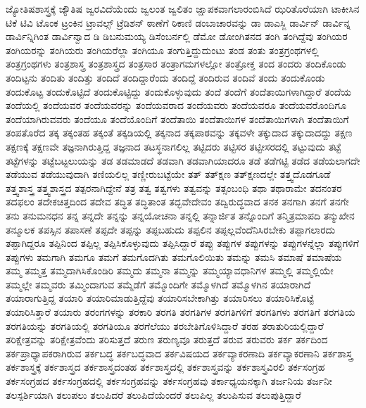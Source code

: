 {ಜ್ಯೋತಿಷಶಾಸ್ತ್ರಕ್ಕೆ
ಜ್ಯೌತಿಷ
ಜ್ವರವಿದೆಯೆಂದು
ಜ್ವಲಂತ
ಜ್ವಲಿತಂ
ಜ್ಷಾಪಕವಾಗಲಾರಂಬಿಸಿದೆ
ಝರಿತೊರೆಯಾಗಿ
ಟಾಕೀಸಿನ
ಟಿಕೆ
ಟಿವಿ
ಟೊಂಕ
ಟ್ರಂಕಿನ
ಟ್ರಾವಲ್ಸ್
ಟ್ರೆಡಿಶನ್
ಠಾಣೆಗೆ
ಠಿಕಾಣಿ
ಡಂಬಾಚಾರವನ್ನು
ಡಾ
ಡಾಎಸ್ಜಿ
ಡಾರ್ವಿನ್
ಡಾರ್ವಿನ್ನ
ಡಾರ್ವಿನ್ನಿಗಿಂತ
ಡಾರ್ವಿನ್ವಾದ
ಡಿ
ಡಿಬನುಮಯ್ಯ
ಡಿಸೆಂಬರ್ನಲ್ಲಿ
ಡೆಮೋ
ಡೋಂಗಿತನದ
ತಂಗಿ
ತಂಗಿದ್ದೆವು
ತಂಗಿಯರ
ತಂಗಿಯರನ್ನು
ತಂಗಿಯರು
ತಂಗಿಯರೆಲ್ಲಾ
ತಂಗಿಯೂ
ತಂಗುತ್ತಿದ್ದುದುಂಟು
ತಂಡ
ತಂತು
ತಂತ್ರಗ್ರಂಥಗಳಲ್ಲಿ
ತಂತ್ರಗ್ರಂಥಗಳು
ತಂತ್ರಶಾಸ್ತ್ರ
ತಂತ್ರಶಾಸ್ತ್ರದ
ತಂತ್ರಸಾರ
ತಂತ್ರಾಗಮಗಳಲ್ಲೋ
ತಂತ್ರೋಕ್ತ
ತಂದ
ತಂದರು
ತಂದಿಕೊಂಡು
ತಂದಿಟ್ಟನು
ತಂದಿತು
ತಂದಿತ್ತು
ತಂದಿದೆ
ತಂದಿದ್ದಾರೆಂದು
ತಂದಿದ್ದೆ
ತಂದಿರುವ
ತಂದಿವೆ
ತಂದು
ತಂದುಕೊಂಡು
ತಂದುಕೊಟ್ಟ
ತಂದುಕೊಟ್ಟಿದೆ
ತಂದುಕೊಟ್ಟಿದ್ದು
ತಂದುಕೊಳ್ಳುವುದು
ತಂದೆ
ತಂದೆಗೆ
ತಂದೆತಾಯಿಗಳಾಗಿದ್ದಾರೆ
ತಂದೆಯ
ತಂದೆಯಲ್ಲಿ
ತಂದೆಯವರ
ತಂದೆಯವರನ್ನು
ತಂದೆಯವರಾದ
ತಂದೆಯವರು
ತಂದೆಯವರೂ
ತಂದೆಯವರೊಂದಿಗೂ
ತಂದೆಯಾಗಿರುವವರು
ತಂದೆಯೂ
ತಂದೆಯೊಂದಿಗೆ
ತಂದೆತಾಯಿ
ತಂದೆತಾಯಿಗಳ
ತಂದೆತಾಯಿಗಳಾಗಿ
ತಂದೆತಾಯಿಗೆ
ತಂಪತೊರೆದ
ತಕ್ಕ
ತಕ್ಕಂತಹ
ತಕ್ಕಂತೆ
ತಕ್ಕಡಿಯಲ್ಲಿ
ತಕ್ಕನಾದ
ತಕ್ಕಪಾಠವನ್ನು
ತಕ್ಕವಳೇ
ತಕ್ಕುದಾದ
ತಕ್ಕುದಾದದ್ದು
ತಕ್ಷಣ
ತಕ್ಷಣಕ್ಕೆ
ತಕ್ಷಣವೇ
ತಜ್ಞನಾಗಿರುತ್ತಿದ್ದ
ತಜ್ಞನಾದ
ತಟಸ್ಥನಾಗಲಿಲ್ಲ
ತಟ್ಟಿದರು
ತಟ್ಟಿಸರ
ತಟ್ಟೀಸರದಲ್ಲಿ
ತಟ್ಟುವುದು
ತಟ್ಟೆ
ತಟ್ಟೆಗಳನ್ನು
ತಟ್ಟೆಬಟ್ಟಲುಯನ್ನು
ತಡ
ತಡಮಾಡದೆ
ತಡವಾಗಿ
ತಡವಾಗಿಯಾದರೂ
ತಡೆ
ತಡೆಗಟ್ಟಿ
ತಡೆದ
ತಡೆಯಲಾಗದೇ
ತಡೆಯುವ
ತಡೆಯುವುದಾಗಿ
ತಣಿಯಲಿಲ್ಲ
ತಣ್ಣೀರುಬಟ್ಟೆಯೇ
ತತ್
ತತ್ಕ್ಷಣ
ತತ್ಕ್ಷಣದಲ್ಲೇ
ತತ್ತ್ವದೊಡಗೂಡೆ
ತತ್ತ್ವಶಾಸ್ತ್ರ
ತತ್ತ್ವಶಾಸ್ತ್ರದ
ತತ್ಪರನಾಗಿದ್ದೇನೆ
ತತ್ರ
ತತ್ವ
ತತ್ವಗಳು
ತತ್ವವನ್ನು
ತತ್ಸಂಬಂಧಿ
ತಥಾ
ತಥಾರಾಮೇ
ತದನಂತರ
ತದಫಲಂ
ತದೇಕಚಿತ್ತದಿಂದ
ತದೇವ
ತದ್ಧಿತ
ತದ್ಧಿತಾಂತ
ತದ್ಭವೇದೇವಂ
ತದ್ವಿರುದ್ಧವಾದ
ತನಕ
ತನಗಾಗಿ
ತನಗೆ
ತನಗೇ
ತನು
ತನುಮನಧನ
ತನ್ನ
ತನ್ನದೇ
ತನ್ನನ್ನು
ತನ್ನಯೋಚನಾ
ತನ್ನಲ್ಲಿ
ತನ್ನಾರ್ಜಿತ
ತನ್ನೊಂದಿಗೆ
ತನ್ಮಿತ್ರಮಾಪದಿ
ತನ್ಮುಖೇನ
ತನ್ಮೂಲಕ
ತಪಸ್ಸಿನ
ತಪಾಸಣೆ
ತಪ್ಪದೇ
ತಪ್ಪನ್ನು
ತಪ್ಪಬಹುದು
ತಪ್ಪಲಿನ
ತಪ್ಪಲ್ಲವೆಂದೆನಿಸಿರಬೇಕು
ತಪ್ಪಾಗಲಾರದು
ತಪ್ಪಾಗಿದ್ದರೂ
ತಪ್ಪಿನಿಂದ
ತಪ್ಪಿಲ್ಲ
ತಪ್ಪಿಸಿಕೊಳ್ಳುವುದು
ತಪ್ಪಿಸಿದ್ದಾರೆ
ತಪ್ಪು
ತಪ್ಪುಗಳ
ತಪ್ಪುಗಳನ್ನು
ತಪ್ಪುಗಳನ್ನೆಲ್ಲಾ
ತಪ್ಪುಗಳಿಗೆ
ತಪ್ಪುಗಳು
ತಮಗಾಗಿ
ತಮಗೂ
ತಮಗೆ
ತಮಗೊದಗಿತು
ತಮಗೊಲಿಯಿತು
ತಮನ್ನು
ತಮಸಿ
ತಮಾಷೆ
ತಮಾಷೆಯ
ತಮ್ಮ
ತಮ್ಮತ್ತ
ತಮ್ಮದಾಗಿಸಿಕೊಂಡಿರಿ
ತಮ್ಮದು
ತಮ್ಮನಾ
ತಮ್ಮನ್ನು
ತಮ್ಮಯ್ಯಾವಧಾನಿಗಳ
ತಮ್ಮಲ್ಲಿ
ತಮ್ಮಲ್ಲಿಯೇ
ತಮ್ಮಲ್ಲೇ
ತಮ್ಮವರು
ತಮ್ಮಿಂದಾಗುವ
ತಮ್ಮೆಡೆಗೆ
ತಮ್ಮೊಂದಿಗೇ
ತಮ್ಮೊಳಗಿದೆ
ತಮ್ಮೊಳಗಿನ
ತಯಾರಾಗಿದೆ
ತಯಾರಾಗುತ್ತಿದ್ದ
ತಯಾರಿ
ತಯಾರಿಮಾಡುತ್ತಿದ್ದೆವು
ತಯಾರಿಸಬೇಕಾಗಿತ್ತು
ತಯಾರಿಸಲು
ತಯಾರಿಸಿಕೊಟ್ಟೆ
ತಯಾರಿಸಿತ್ತಾರೆ
ತಯಾರು
ತರಂಗಗಳನ್ನು
ತರಕಾರಿ
ತರಗತಿ
ತರಗತಿಗಳ
ತರಗತಿಗಳಿಗೆ
ತರಗತಿಗಳು
ತರಗತಿಗೆ
ತರಗತಿಯ
ತರಗತಿಯನ್ನು
ತರಗತಿಯಲ್ಲಿ
ತರಗತಿಯೂ
ತರಗೆಲೆಯು
ತರಬೇತಿಗೊಳಿಸಿದ್ದಾರೆ
ತರಹ
ತರಾತುರಿಯಲ್ಲಿದ್ದಾರೆ
ತರಿಕ್ಷೇತ್ರವನ್ನು
ತರಿಕ್ಷೇತ್ರವೆಂದು
ತರಿಸುತ್ತದೆ
ತರುಣ
ತರುಣ್ಯವೂ
ತರುತ್ತದೆ
ತರುವ
ತರುವರು
ತರ್ಕ
ತರ್ಕದಿಂದ
ತರ್ಕಪ್ರಾಧ್ಯಾಪಕರಾಗಿರುವ
ತರ್ಕಬದ್ಧ
ತರ್ಕಬದ್ಧವಾದ
ತರ್ಕವಿಷಯದ
ತರ್ಕವ್ಯಾಕರಣಾದಿ
ತರ್ಕವ್ಯಾಕರಣಾನಿ
ತರ್ಕಶಾಸ್ತ್ರ
ತರ್ಕಶಾಸ್ತ್ರಕ್ಕೆ
ತರ್ಕಶಾಸ್ತ್ರದ
ತರ್ಕಶಾಸ್ತ್ರದಂತಹ
ತರ್ಕಶಾಸ್ತ್ರದಲ್ಲಿ
ತರ್ಕಶಾಸ್ತ್ರವನ್ನು
ತರ್ಕಶಾಸ್ತ್ರವಿರಲಿ
ತರ್ಕಸಂಗ್ರಹ
ತರ್ಕಸಂಗ್ರಹದ
ತರ್ಕಸಂಗ್ರಹದಲ್ಲಿ
ತರ್ಕಸಂಗ್ರಹವನ್ನು
ತರ್ಕಸಂಗ್ರಹವು
ತರ್ಕಾಧ್ಯಯನಕ್ಕಾಗಿ
ತರ್ಜನಿಯ
ತರ್ಜನೀ
ತಲಸ್ಪರ್ಶಿಯಾಗಿ
ತಲುಪಲು
ತಲುಪಿದರೆ
ತಲುಪಿದೆಯೆಂದರೆ
ತಲುಪಿಲ್ಲ
ತಲುಪಿಸುವ
ತಲುಪುತ್ತಿದ್ದಾರೆ
}
